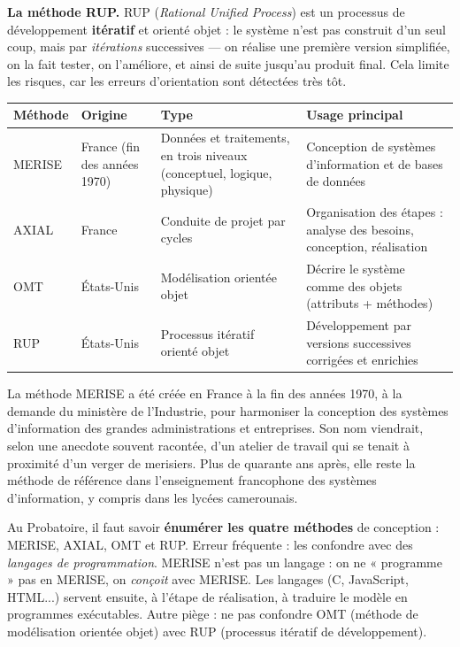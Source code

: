 \documentclass[11pt]{article}
\begin{document}
\textbf{La méthode RUP.} RUP (\emph{Rational Unified Process}) est un processus de développement \textbf{itératif} et orienté objet : le système n'est pas construit d'un seul coup, mais par \emph{itérations} successives — on réalise une première version simplifiée, on la fait tester, on l'améliore, et ainsi de suite jusqu'au produit final. Cela limite les risques, car les erreurs d'orientation sont détectées très tôt.

\begin{center}
\begin{tabularx}{\linewidth}{|l|l|X|X|}
\hline
\rowcolor{popblueL} \textbf{Méthode} & \textbf{Origine} & \textbf{Type} & \textbf{Usage principal} \\
\hline
MERISE & France (fin des années 1970) & Données et traitements, en trois niveaux (conceptuel, logique, physique) & Conception de systèmes d'information et de bases de données \\
\hline
AXIAL & France & Conduite de projet par cycles & Organisation des étapes : analyse des besoins, conception, réalisation \\
\hline
OMT & États-Unis & Modélisation orientée objet & Décrire le système comme des objets (attributs + méthodes) \\
\hline
RUP & États-Unis & Processus itératif orienté objet & Développement par versions successives corrigées et enrichies \\
\hline
\end{tabularx}
\end{center}

\begin{savaistu}
La méthode MERISE a été créée en France à la fin des années 1970, à la demande du ministère de l'Industrie, pour harmoniser la conception des systèmes d'information des grandes administrations et entreprises. Son nom viendrait, selon une anecdote souvent racontée, d'un atelier de travail qui se tenait à proximité d'un verger de merisiers. Plus de quarante ans après, elle reste la méthode de référence dans l'enseignement francophone des systèmes d'information, y compris dans les lycées camerounais.
\end{savaistu}

\begin{attention}
Au Probatoire, il faut savoir \textbf{énumérer les quatre méthodes} de conception : MERISE, AXIAL, OMT et RUP. Erreur fréquente : les confondre avec des \emph{langages de programmation}. MERISE n'est pas un langage : on ne « programme » pas en MERISE, on \emph{conçoit} avec MERISE. Les langages (C, JavaScript, HTML...) servent ensuite, à l'étape de réalisation, à traduire le modèle en programmes exécutables. Autre piège : ne pas confondre OMT (méthode de modélisation orientée objet) avec RUP (processus itératif de développement).
\end{attention}
\end{document}

